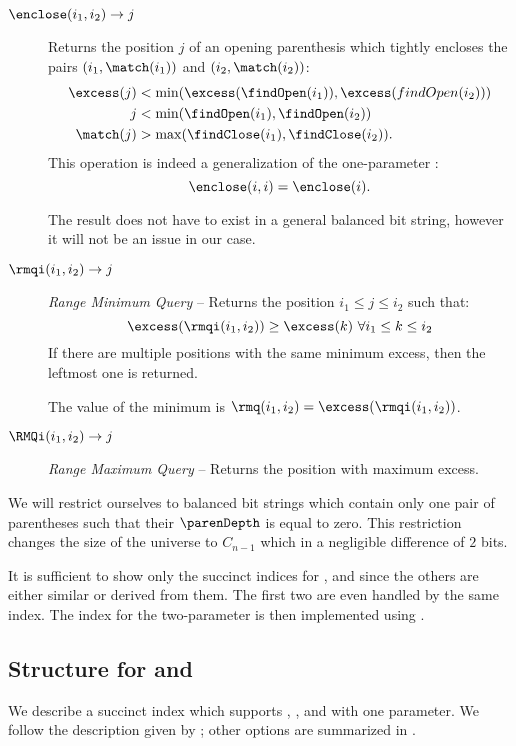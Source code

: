\begin{description}
	\item[$\enclose(i_1, i_2) \rightarrow j$]
	Returns the position $j$ of an opening parenthesis which tightly encloses the pairs $(i_1, \match(i_1))$ and $(i_2, \match(i_2))$:
	\begin{align*}
		\excess(j) &< \min(\excess(\findOpen(i_1)), \excess(findOpen(i_2))) \\
		j &< \min(\findOpen(i_1), \findOpen(i_2)) \\
		\match(j) &> \max(\findClose(i_1), \findClose(i_2)).
	\end{align*}
	This operation is indeed a generalization of the one-parameter \enclose{}:
	$$\enclose(i, i) = \enclose(i).$$
	
	The result does not have to exist in a general balanced bit string, however it will not be an issue in our case.
	
	\item[$\rmqi(i_1, i_2) \rightarrow j$]
	\emph{Range Minimum Query} -- Returns the position $i_1 \le j \le i_2$ such that: 
	$$\excess(\rmqi(i_1, i_2)) \ge \excess(k) \ \forall i_1 \le k \le i_2$$
	If there are multiple positions with the same minimum excess, then the leftmost one is returned.
	
	The value of the minimum is $\rmq(i_1, i_2) = \excess(\rmqi(i_1, i_2))$.
	
	\item[$\RMQi(i_1, i_2) \rightarrow j$]
	\emph{Range Maximum Query} -- Returns the position with maximum excess.
\end{description}

We will restrict ourselves to balanced bit strings which contain only one pair of parentheses such that their $\parenDepth$ is equal to zero.
This restriction changes the size of the universe to $C_{n-1}$ which in a negligible difference of $2$ bits.

\bigbreak

It is sufficient to show only the succinct indices for \findClose{}, \enclose{} and \rmqi{} since the others are either similar or derived from them.
The first two are even handled by the same index.
The index for the two-parameter \enclose{} is then implemented using \rmqi.

\subsection{Structure for \match{} and \enclose{}}\label{s:match-enclose}

We describe a succinct index which supports \findClose{}, \findOpen{}, and \enclose{} with one parameter.
We follow the description given by \cite{geary2006simple}; other options are summarized in \cite{arroyuelo2010succinct}.

